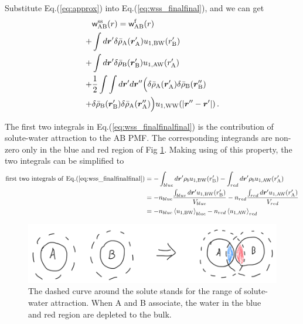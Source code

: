 \documentclass[9pt]{article}
\renewcommand{\vec}[1]{\mbox{\boldmath$#1$}}
\newcommand{\A}{\mathrm{A}}
\newcommand{\W}{\mathrm{W}}
\newcommand{\B}{\mathrm{B}}
\newcommand{\f}{\mathrm{f}}
\newcommand{\sss}{\mathrm{ss}}
\newcommand{\w}{\mathsf{w}}
\begin{document}
Substitute Eq.(\ref{eq:approx}) into Eq.(\ref{eq:wss_finalfinal}), and we can get
\begin{align}
\begin{split}
 & \w_{\A\B}^{\sss}(r) =  \w_{\A\B}^{\f}(r) \\
+ & \int d \vec{r}'\delta \bar{\rho}_{\A}(\vec{r}_{\A}') u_{1,\B\W}(r_{\B}') \\
 +&  \int d \vec{r}'\delta \bar{\rho}_{\B}(\vec{r}_{\B}') u_{1,\A\W}(r_{\A}') \\
 + &  \frac{1}{2} \int \int d \vec{r}' d \vec{r}'' \Big( \delta \bar{\rho}_{\A}(\vec{r}_{\A}') \delta \bar{\rho}_{\B}(\vec{r}_{\B}'') \\
 + & \delta \bar{\rho}_{\B}(\vec{r}_{\B}') \delta \bar{\rho}_{\A}(\vec{r}_{\A}'') \Big) u_{1,\W\W}(|\vec{r}'' - \vec{r}'|) \,.
\end{split}
\label{eq:wss_finalfinalfinal}
\end{align}

The first two integrals in Eq.(\ref{eq:wss_finalfinalfinal}) is the contribution of solute-water attraction to the AB PMF. The corresponding integrands are non-zero only in the blue and red region of Fig \ref{fig:sw}. Making using of this property, the two integrals can be simplified to
 \begin{align}
\begin{split}
\mathrm{first\,\, two\,\, integrals\,\, of\,\, Eq.(\ref{eq:wss_finalfinalfinal})} & = -\int_{blue}d \vec{r}' \rho_b u_{1,\B\W}(r_{\B}')  -\int_{red}d \vec{r}' \rho_b u_{1,\A\W}(r_{\A}') \\
& = -n_{blue}\frac{\int_{blue}d \vec{r}' u_{1,\B\W}(r_{\B}')}{V_{blue}} -n_{red}\frac{\int_{red}d \vec{r}' u_{1,\A\W}(r_{\A}')}{V_{red}} \\
& = -n_{blue} \left\langle u_{1,\B\W} \right\rangle_{blue} - n_{red} \left\langle u_{1,\A\W} \right\rangle_{red}
\end{split}
\label{eq:wss_solutewater}
\end{align}
\begin{figure}[htp]
\centering
\includegraphics[scale=0.35]{Fig_SW.png}
\caption{The dashed curve around the solute stands for the range of solute-water attraction. When A and B associate, the water in the blue and red region are depleted to the bulk.}
\label{fig:sw}
\end{figure}
\end{document}
